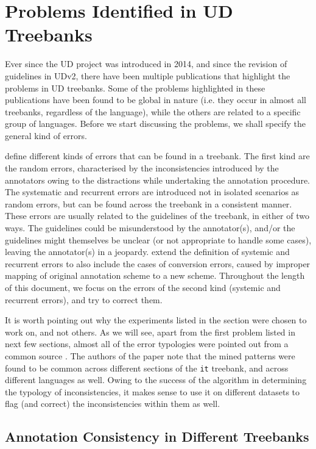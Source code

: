 \chapter{Problems Identified in UD Treebanks}
\label{sec:problems}

Ever since the UD project was introduced in 2014, and since the revision of guidelines in UDv2, there have been multiple publications that highlight the problems in UD treebanks. Some of the problems highlighted in these publications have been found to be global in nature (i.e. they occur in almost all treebanks, regardless of the language), while the others are related to a specific group of languages. Before we start discussing the problems, we shall specify the general kind of errors.

\cite{error-types} define different kinds of errors that can be found in a treebank. The first kind are the random errors, characterised by the inconsistencies introduced by the annotators owing to the distractions while undertaking the annotation procedure. The systematic and recurrent errors are introduced not in isolated scenarios as random errors, but can be found across the treebank in a consistent manner. These errors are usually related to the guidelines of the treebank, in either of two ways. The guidelines could be misunderstood by the annotator(s), and/or the guidelines might themselves be unclear (or not appropriate to handle some cases), leaving the annotator(s) in a jeopardy. \cite{alzetta2017dangerous} extend the definition of systemic and recurrent errors to also include the cases of conversion errors, caused by improper mapping of original annotation scheme to a new scheme. Throughout the length of this document, we focus on the errors of the second kind (systemic and recurrent errors), and try to correct them.

It is worth pointing out why the experiments listed in the section were chosen to work on, and not others. As we will see, apart from the first problem listed in next few sections, almost all of the error typologies were pointed out from a common source \citep{alzetta2017dangerous}. The authors of the paper note that the mined patterns were found to be common across different sections of the \verb|it| treebank, and across different languages as well. Owing to the success of the algorithm in determining the typology of inconsistencies, it makes sense to use it on different datasets to flag (and correct) the inconsistencies within them as well.

\section{Annotation Consistency in Different Treebanks}
\label{sec:harmony}

